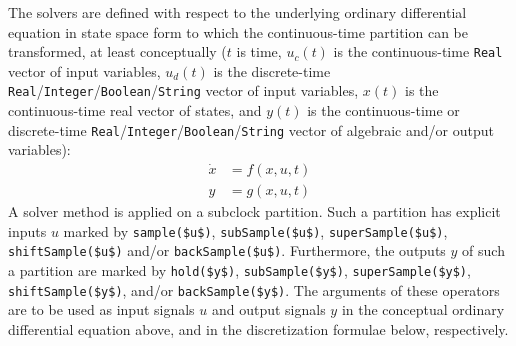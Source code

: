The solvers are defined with respect to the underlying ordinary
differential equation in state space form to which the continuous-time
partition can be transformed, at least conceptually ($t$ is time,
$u_{c}(t)$ is the continuous-time \lstinline!Real! vector
of input variables, $u_{d}(t)$ is the
discrete-time \lstinline!Real!/\lstinline!Integer!/\lstinline!Boolean!/\lstinline!String! vector of input variables,
$x(t)$ is the continuous-time real vector of states, and
$y(t)$ is the continuous-time or discrete-time
\lstinline!Real!/\lstinline!Integer!/\lstinline!Boolean!/\lstinline!String! vector of algebraic and/or output variables):
\begin{align*}
\dot{x} &= f(x, u, t)\\
y &= g(x, u, t)
\end{align*}
A solver method is applied on a subclock partition. Such a partition has
explicit inputs $u$ marked by \lstinline!sample($u$)!,
\lstinline!subSample($u$)!, \lstinline!superSample($u$)!, \lstinline!shiftSample($u$)!
and/or \lstinline!backSample($u$)!. Furthermore, the outputs $y$ of
such a partition are marked by \lstinline!hold($y$)!, \lstinline!subSample($y$)!,
\lstinline!superSample($y$)!, \lstinline!shiftSample($y$)!, and/or
\lstinline!backSample($y$)!. The arguments of these operators are to be used
as input signals $u$ and output signals $y$ in the
conceptual ordinary differential equation above, and in the
discretization formulae below, respectively.

